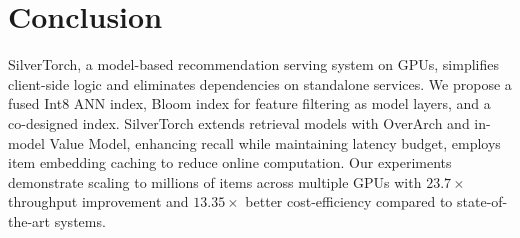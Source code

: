 \section{Conclusion}
\label{sec:8}
SilverTorch, a model-based recommendation serving system on GPUs, simplifies client-side logic and eliminates dependencies on standalone services. We propose a fused Int8 ANN index, Bloom index for feature filtering as model layers, and a co-designed index. SilverTorch extends retrieval models with OverArch and in-model Value Model, enhancing recall while maintaining latency budget, employs item embedding caching to reduce online computation. Our experiments demonstrate scaling to millions of items across multiple GPUs with $23.7\times$ throughput improvement and $13.35\times$ better cost-efficiency compared to state-of-the-art systems. %